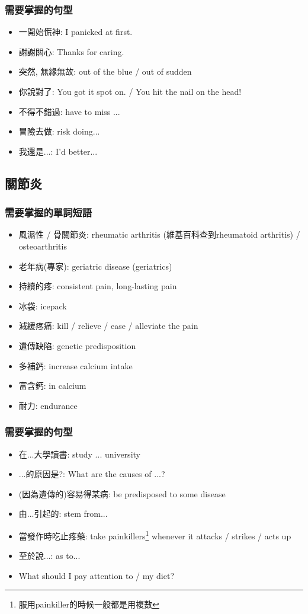 \subsubsection*{需要掌握的句型}
\begin{itemize}
  \itemsep0em
  \item 一開始慌神: I panicked at first.
  \item 謝謝關心: Thanks for caring.
  \item 突然, 無緣無故: out of the blue / out of sudden
  \item 你說對了: You got it spot on. / You hit the nail on the head!
  \item 不得不錯過: have to miss ...
  \item 冒險去做: risk doing...
  \item 我還是...: I'd better...
\end{itemize}

\subsection{關節炎}
\subsubsection*{需要掌握的單詞短語}
\begin{itemize}
  \itemsep0em
  \item 風濕性 / 骨關節炎: rheumatic arthritis (維基百科查到rheumatoid arthritis) / osteoarthritis
  \item 老年病(專家): geriatric disease (geriatrics)
  \item 持續的疼: consistent pain, long-lasting pain
  \item 冰袋: icepack
  \item 減緩疼痛: kill / relieve / ease / alleviate the pain
  \item 遺傳缺陷: genetic predisposition
  \item 多補鈣: increase calcium intake
  \item 富含鈣:  in calcium
  \item 耐力: endurance
\end{itemize}

\subsubsection*{需要掌握的句型}
\begin{itemize}
  \itemsep0em
  \item 在...大學讀書: study  ... university
  \item ...的原因是?: What are the causes of ...?
  \item (因為遺傳的)容易得某病: be predisposed to some disease
  \item 由...引起的: stem from...
  \item 當發作時吃止疼藥: take painkillers\footnote{服用painkiller的時候一般都是用複數} whenever it attacks / strikes / acts up
  \item 至於說...: as to...
  \item What should I pay attention to  /  my diet?
\end{itemize}


